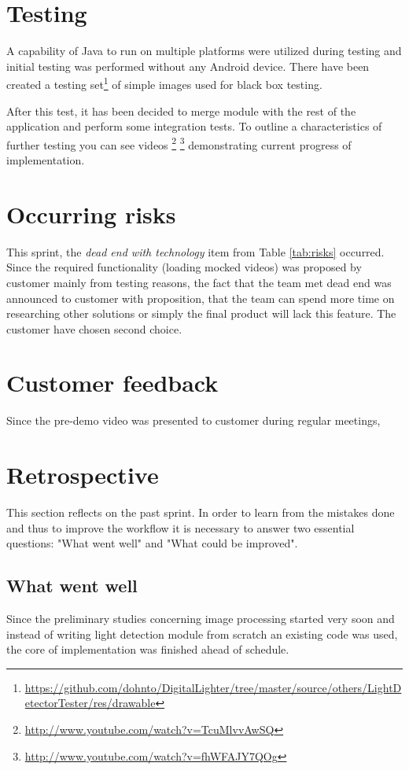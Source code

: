 \section{Testing}
A capability of Java to run on multiple platforms were utilized during testing and initial testing was performed without any Android device.
There have been created a testing set\footnote{\url{https://github.com/dohnto/DigitalLighter/tree/master/source/others/LightDetectorTester/res/drawable}} of simple images used for black box testing.

After this test, it has been decided to merge module with the rest of the application and perform some integration tests.
To outline a characteristics of further testing you can see videos \footnote{\url{http://www.youtube.com/watch?v=TcuMlvvAwSQ}} \footnote{\url{http://www.youtube.com/watch?v=fhWFAJY7QOg}} demonstrating current progress of implementation.

\section{Occurring risks}
This sprint, the \emph{dead end with technology} item from Table \ref{tab:risks} occurred. 
Since the required functionality (loading mocked videos) was proposed by customer mainly from testing reasons, the fact that the team met dead end was announced to customer with proposition, that the team can spend more time on researching other solutions or simply the final product will lack this feature.
The customer have chosen second choice.

\section{Customer feedback}
Since the pre-demo video was presented to customer during regular meetings, 

\section{Retrospective}
This section reflects on the past sprint. In order to learn from the mistakes done and thus to improve the workflow it is necessary to answer two essential questions: "What went well" and "What could be improved".

\subsection{What went well}
Since the preliminary studies concerning image processing started very soon and instead of writing light detection module from scratch an existing code was used, the core of implementation was finished ahead of schedule.

